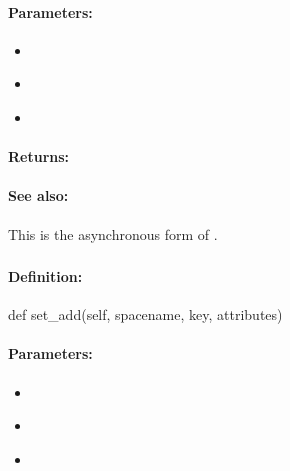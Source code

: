 \paragraph{Parameters:}
\begin{itemize}[noitemsep]
\item {}\\

\item {}\\

\item {}\\

\end{itemize}

\paragraph{Returns:}


\paragraph{See also:}  This is the asynchronous form of .

\pagebreak
\subsubsection{}
\label{api:python:set_add}


\paragraph{Definition:}
\begin{pythoncode}
def set_add(self, spacename, key, attributes)
\end{pythoncode}

\paragraph{Parameters:}
\begin{itemize}[noitemsep]
\item {}\\

\item {}\\

\item {}\\

\end{itemize}

